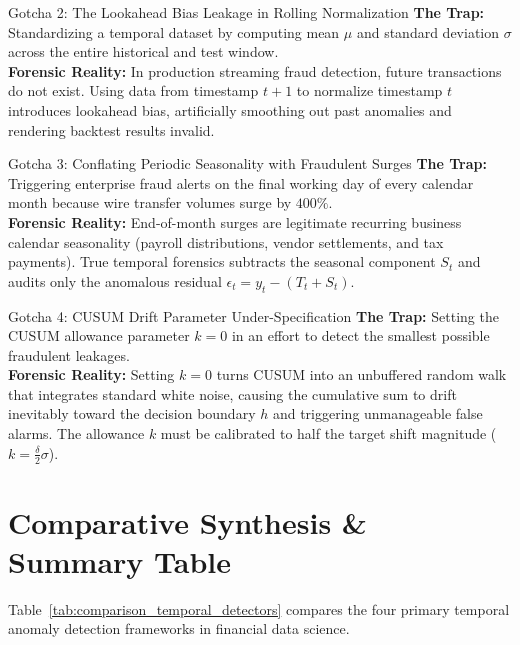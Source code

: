 \begin{trapbox}{Gotcha 2: The Lookahead Bias Leakage in Rolling Normalization}
\textbf{The Trap:} Standardizing a temporal dataset by computing mean $\mu$ and standard deviation $\sigma$ across the entire historical and test window.\\
\textbf{Forensic Reality:} In production streaming fraud detection, future transactions do not exist. Using data from timestamp $t+1$ to normalize timestamp $t$ introduces lookahead bias, artificially smoothing out past anomalies and rendering backtest results invalid.
\end{trapbox}

\begin{trapbox}{Gotcha 3: Conflating Periodic Seasonality with Fraudulent Surges}
\textbf{The Trap:} Triggering enterprise fraud alerts on the final working day of every calendar month because wire transfer volumes surge by $400\%$.\\
\textbf{Forensic Reality:} End-of-month surges are legitimate recurring business calendar seasonality (payroll distributions, vendor settlements, and tax payments). True temporal forensics subtracts the seasonal component $S_t$ and audits only the anomalous residual $\epsilon_t = y_t - (T_t + S_t)$.
\end{trapbox}

\begin{trapbox}{Gotcha 4: CUSUM Drift Parameter Under-Specification}
\textbf{The Trap:} Setting the CUSUM allowance parameter $k = 0$ in an effort to detect the smallest possible fraudulent leakages.\\
\textbf{Forensic Reality:} Setting $k = 0$ turns CUSUM into an unbuffered random walk that integrates standard white noise, causing the cumulative sum to drift inevitably toward the decision boundary $h$ and triggering unmanageable false alarms. The allowance $k$ must be calibrated to half the target shift magnitude ($k = \frac{\delta}{2} \sigma$).
\end{trapbox}

\section{Comparative Synthesis \& Summary Table}

Table~\ref{tab:comparison_temporal_detectors} compares the four primary temporal anomaly detection frameworks in financial data science.

